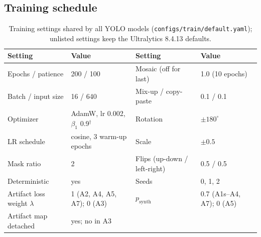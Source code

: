 \documentclass[10pt,a4paper]{article}
\begin{document}
\subsection{Training schedule}
\begin{table}[H]
\centering
\caption{Training settings shared by all YOLO models (\texttt{configs/train/default.yaml}); unlisted settings keep the Ultralytics 8.4.13 defaults.}
\label{tab:s-hyp}
\small
\begin{tabular}{ll@{\qquad}ll}
\toprule
Setting & Value & Setting & Value \\
\midrule
Epochs / patience & 200 / 100 & Mosaic (off for last) & 1.0 (10 epochs) \\
Batch / input size & 16 / 640 & Mix-up / copy-paste & 0.1 / 0.1 \\
Optimizer & AdamW, lr 0.002, $\beta_1$ 0.9$^{\dagger}$ & Rotation & $\pm180^\circ$ \\
LR schedule & cosine, 3 warm-up epochs & Scale & $\pm0.5$ \\
Mask ratio & 2 & Flips (up-down / left-right) & 0.5 / 0.5 \\
Deterministic & yes & Seeds & 0, 1, 2 \\
Artifact loss weight $\lambda$ & 1 (A2, A4, A5, A7); 0 (A3) & $p_{\mathrm{synth}}$ & 0.7 (A1s--A4, A7); 0 (A5) \\
Artifact map detached & yes; no in A3 & & \\
\bottomrule
\end{tabular}
\par{}
\end{table}
\end{document}
